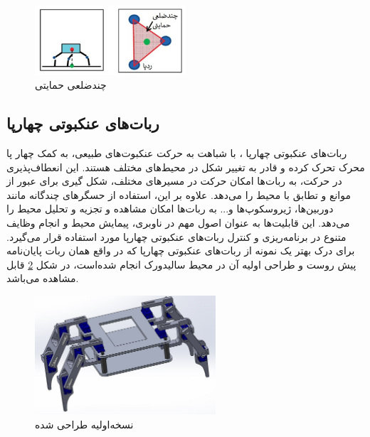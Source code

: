 \begin{figure}[H]
	\centering
	\includegraphics[width=0.5\textwidth]{./images/Chapter1/StaticStability}	
	\caption[پایداری استاتیکی]{چندضلعی حمایتی \cite{StaticStability}}
	\label{پایداری استاتیکی}
\end{figure}
\noindent
\unskip



\subsection{ربات‌های عنکبوتی چهارپا}
ربات‌های عنکبوتی چهارپا
\noindent\unskip{}
، با شباهت به حرکت عنکبوت‌های طبیعی، به کمک چهار پا محرک تحرک کرده و قادر به تغییر شکل در محیط‌های مختلف هستند. این انعطاف‌پذیری در حرکت، به ربات‌ها امکان حرکت در مسیرهای مختلف، شکل گیری برای عبور از موانع و تطابق با محیط را می‌دهد. علاوه بر این، استفاده از حسگرهای چندگانه مانند دوربین‌ها، ژیروسکوپ‌ها و... به ربات‌ها امکان مشاهده و تجزیه و تحلیل محیط را می‌دهد. این قابلیت‌ها به عنوان اصول مهم در ناوبری، پیمایش محیط و انجام وظایف متنوع در برنامه‌ریزی و کنترل ربات‌های عنکبوتی چهارپا مورد استفاده قرار می‌گیرد.
برای درک بهتر یک نمونه از ربات‌های عنکبوتی چهارپا که در واقع همان ربات پایان‌نامه پیش روست و طراحی اولیه آن در محیط سالیدورک انجام شده‌است، در شکل 
\ref{نسخه‌اولیه }
قابل مشاهده می‌باشد.

\begin{figure}[H]
	\centering
	\includegraphics[width=0.6\textwidth]{./images/Chapter1/Robot_Final}	
	\caption[نسخه‌اولیه طراحی شده]{نسخه‌اولیه طراحی شده}
	\label{نسخه‌اولیه }
\end{figure}
\noindent
\unskip

